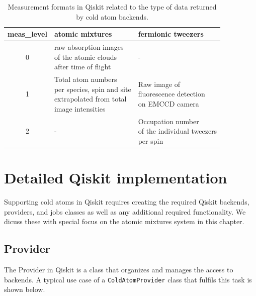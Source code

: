 \documentclass[a4paper, 10pt]{article}
\begin{document}
    \begin{table}[htbp]
    \centering
    \caption{Measurement formats in Qiskit related to the type of data returned by cold atom backends.}
    \label{tab:meas_levels_cold_atoms}
    \begin{tabular}{c l l}\hline
            meas\_level &  atomic mixtures & fermionic tweezers \\ \hline\hline
            0 & \makecell[l]{raw absorption images\\ of the atomic clouds \\ after time of flight} & - \\
            \hline
            1 & \makecell[l]{Total atom numbers \\per species, spin and site\\ extrapolated from total \\ image intensities} & \makecell[l]{Raw image of \\ fluorescence detection\\ on EMCCD camera}\\
            \hline
            2 & - & \makecell[l]{Occupation number \\of the individual tweezers \\ per spin 
            }\\
    \hline
    \end{tabular}
\end{table}
    



\section{Detailed Qiskit implementation}

Supporting cold atoms in Qiskit requires creating the required Qiskit backends, providers, and jobs classes as well as any additional required functionality. We dicuss these with special focus on the atomic mixtures system in this chapter. 

\subsection{Provider}

The Provider in Qiskit is a class that organizes and manages the access to backends. 
A typical use case of a \texttt{ColdAtomProvider} class that fulfils this task is shown below.
\end{document}

